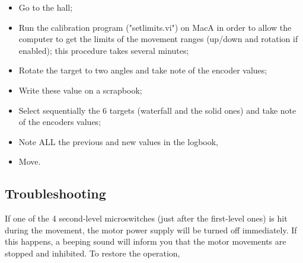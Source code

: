 \begin{itemize}
\item Go to the hall;
\item Run the calibration program  ("setlimits.vi") on MacA in order to
 	allow the computer to get the limits of the movement ranges 
	(up/down and rotation if enabled); this procedure takes 
	several minutes;
\item Rotate the target to two angles and take note of the encoder values;
\item Write these value on a scrapbook;
\item Select sequentially the 6 targets (waterfall and the solid ones) 
	and take note of the encoders values;
\item Note ALL the previous and new values in the logbook,
\item Move.
\end{itemize} 
 
\subsection{Troubleshooting}


If one of the 4 second-level microswitches (just after the
first-level ones) is hit during the movement, the motor power supply 
will be turned off immediately. 
If this happens, a beeping sound will inform you that the motor movements are 
stopped and inhibited. To restore the operation,
 

